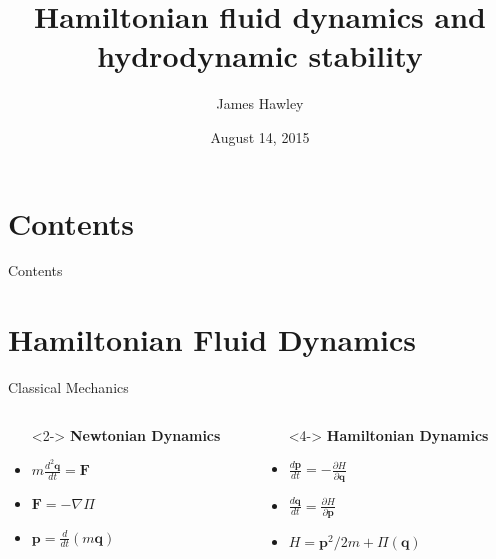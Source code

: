 \documentclass{beamer}
\title{Hamiltonian fluid dynamics and hydrodynamic stability}
\author{James Hawley}
\date{August 14, 2015}
\institute{University of Waterloo}
\begin{document}
	\begin{frame}
		\titlepage
	\end{frame}

	\section*{Contents}
		\begin{frame}{Contents}
			\tableofcontents
		\end{frame}

	\section{Hamiltonian Fluid Dynamics}
		\begin{frame}[t]{Classical Mechanics}
			\begin{columns}
				\begin{column}{0.5\textwidth}
					\begin{itemize}
						\item[]<2-> \textbf{Newtonian Dynamics}
						\item<3-> $m\frac{d^2 \mathbf{q}}{dt} = \mathbf{F}$
						\item<3-> $\mathbf{F} = -\nabla \Pi$
						\item<3-> $\mathbf{p} = \frac{d}{dt}(m\mathbf{q})$
					\end{itemize}
				\end{column}
				\begin{column}{0.5\textwidth}
					\begin{itemize}
						\item[]<4-> \textbf{Hamiltonian Dynamics}
						\item<5-> $\frac{d \mathbf{p}}{dt} = -\frac{\partial H}{\partial \mathbf{q}}$
						\item<5-> $\frac{d \mathbf{q}}{dt} = \frac{\partial H}{\partial \mathbf{p}}$
						\item<5-> $H = \mathbf{p}^2/2m + \Pi(\mathbf{q})$
					\end{itemize}
				\end{column}
			\end{columns}
		\end{frame}
\end{document}
